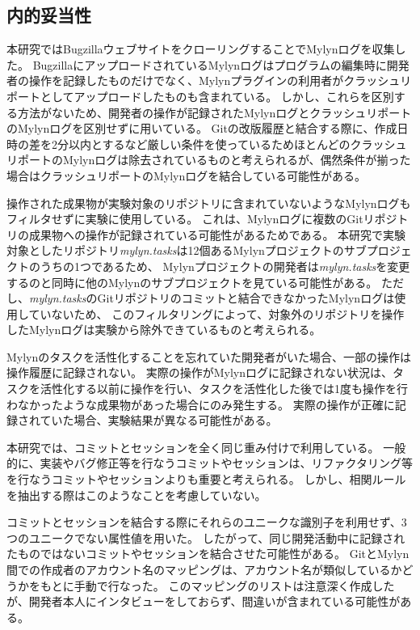 \documentclass[a4paper]{jsbook}
\begin{document}
\subsection{内的妥当性}
本研究ではBugzillaウェブサイトをクローリングすることでMylynログを収集した。
BugzillaにアップロードされているMylynログはプログラムの編集時に開発者の操作を記録したものだけでなく、Mylynプラグインの利用者がクラッシュリポートとしてアップロードしたものも含まれている。
しかし、これらを区別する方法がないため、開発者の操作が記録されたMylynログとクラッシュリポートのMylynログを区別せずに用いている。
Gitの改版履歴と結合する際に、作成日時の差を2分以内とするなど厳しい条件を使っているためほとんどのクラッシュリポートのMylynログは除去されているものと考えられるが、偶然条件が揃った場合はクラッシュリポートのMylynログを結合している可能性がある。

操作された成果物が実験対象のリポジトリに含まれていないようなMylynログもフィルタせずに実験に使用している。
これは、Mylynログに複数のGitリポジトリの成果物への操作が記録されている可能性があるためである。
本研究で実験対象としたリポジトリ{\it mylyn.tasks}は12個あるMylynプロジェクトのサブプロジェクトのうちの1つであるため、
Mylynプロジェクトの開発者は{\it mylyn.tasks}を変更するのと同時に他のMylynのサブプロジェクトを見ている可能性がある。
ただし、{\it mylyn.tasks}のGitリポジトリのコミットと結合できなかったMylynログは使用していないため、
このフィルタリングによって、対象外のリポジトリを操作したMylynログは実験から除外できているものと考えられる。

Mylynのタスクを活性化することを忘れていた開発者がいた場合、一部の操作は操作履歴に記録されない。
実際の操作がMylynログに記録されない状況は、タスクを活性化する以前に操作を行い、タスクを活性化した後では1度も操作を行わなかったような成果物があった場合にのみ発生する。
実際の操作が正確に記録されていた場合、実験結果が異なる可能性がある。

本研究では、コミットとセッションを全く同じ重み付けで利用している。
一般的に、実装やバグ修正等を行なうコミットやセッションは、リファクタリング等を行なうコミットやセッションよりも重要と考えられる。
しかし、相関ルールを抽出する際はこのようなことを考慮していない。

コミットとセッションを結合する際にそれらのユニークな識別子を利用せず、3つのユニークでない属性値を用いた。
したがって、同じ開発活動中に記録されたものではないコミットやセッションを結合させた可能性がある。
GitとMylyn間での作成者のアカウント名のマッピングは、アカウント名が類似しているかどうかをもとに手動で行なった。
このマッピングのリストは注意深く作成したが、開発者本人にインタビューをしておらず、間違いが含まれている可能性がある。
\end{document}

